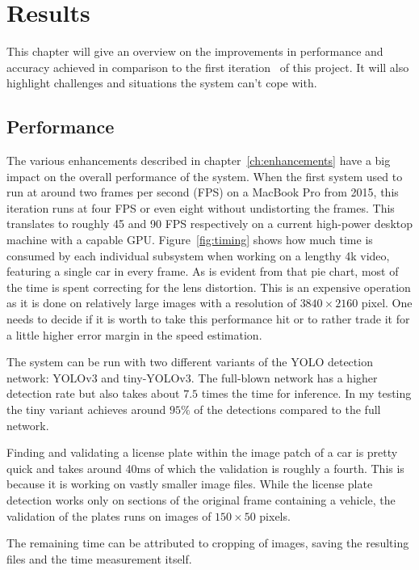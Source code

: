 \chapter{Results} \label{ch:results}

This chapter will give an overview on the improvements in performance and accuracy achieved in comparison to the first iteration~\cite{Berger2018} of this project.
It will also highlight challenges and situations the system can't cope with.

\section{Performance}

The various enhancements described in chapter~\ref{ch:enhancements} have a big impact on the overall performance of the system.
When the first system used to run at around two frames per second (FPS) on a MacBook Pro from 2015, this iteration runs at four FPS or even eight without undistorting the frames.
This translates to roughly 45 and 90 FPS respectively on a current high-power desktop machine with a capable GPU\@.
Figure~\ref{fig:timing} shows how much time is consumed by each individual subsystem when working on a lengthy 4k video, featuring a single car in every frame.
As is evident from that pie chart, most of the time is spent correcting for the lens distortion.
This is an expensive operation as it is done on relatively large images with a resolution of $3840 \times 2160$ pixel.
One needs to decide if it is worth to take this performance hit or to rather trade it for a little higher error margin in the speed estimation.

The system can be run with two different variants of the YOLO detection network: YOLOv3 and tiny-YOLOv3.
The full-blown network has a higher detection rate but also takes about $7.5$ times the time for inference.
In my testing the tiny variant achieves around $95\%$ of the detections compared to the full network.

Finding and validating a license plate within the image patch of a car is pretty quick and takes around 40ms of which the validation is roughly a fourth.
This is because it is working on vastly smaller image files.
While the license plate detection works only on sections of the original frame containing a vehicle, the validation of the plates runs on images of $150 \times 50$ pixels.

The remaining time can be attributed to cropping of images, saving the resulting files and the time measurement itself.

